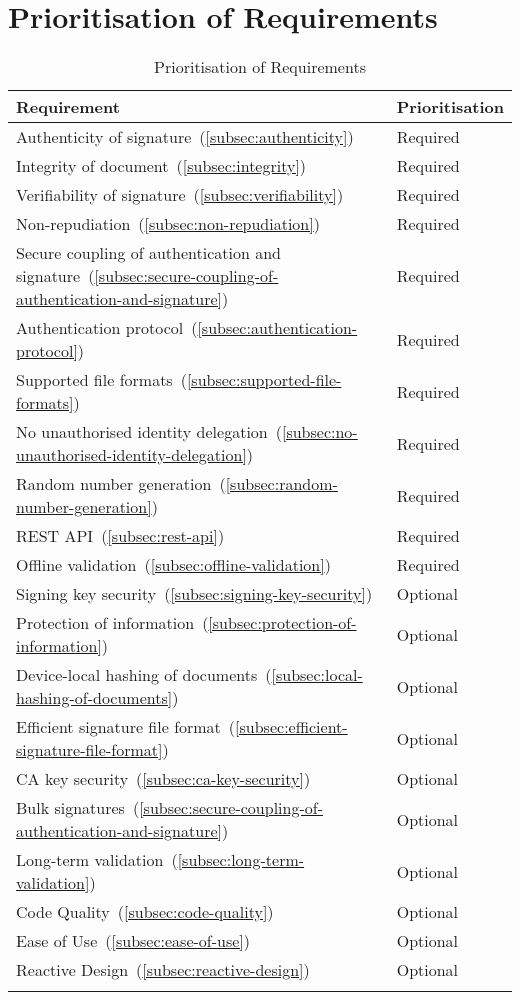\section{Prioritisation of Requirements}
\label{sec:prioritisation}
\begin{longtable}{p{12cm}|p{2.5cm}}
    \textbf{Requirement} & \textbf{Prioritisation}\\
    \hline
    Authenticity of signature~(\ref{subsec:authenticity}) & Required\\
    Integrity of document~(\ref{subsec:integrity}) & Required\\
    Verifiability of signature~(\ref{subsec:verifiability}) & Required\\
    Non-repudiation~(\ref{subsec:non-repudiation}) & Required\\
    Secure coupling of authentication and signature~(\ref{subsec:secure-coupling-of-authentication-and-signature}) & Required\\
    Authentication protocol~(\ref{subsec:authentication-protocol}) & Required\\
    Supported file formats~(\ref{subsec:supported-file-formats}) & Required\\
    No unauthorised identity delegation~(\ref{subsec:no-unauthorised-identity-delegation}) & Required\\
    Random number generation~(\ref{subsec:random-number-generation}) & Required\\
    \gls{REST} \gls{API}~(\ref{subsec:rest-api}) & Required\\
    Offline validation~(\ref{subsec:offline-validation}) & Required\\
    Signing key security~(\ref{subsec:signing-key-security}) & Optional\\
    Protection of information~(\ref{subsec:protection-of-information}) & Optional\\
    Device-local hashing of documents~(\ref{subsec:local-hashing-of-documents}) & Optional\\
    Efficient signature file format~(\ref{subsec:efficient-signature-file-format}) & Optional\\
    \gls{CA} key security~(\ref{subsec:ca-key-security}) & Optional\\
    Bulk signatures~(\ref{subsec:secure-coupling-of-authentication-and-signature}) & Optional\\
    Long-term validation~(\ref{subsec:long-term-validation}) & Optional\\
    Code Quality~(\ref{subsec:code-quality}) & Optional\\
    Ease of Use~(\ref{subsec:ease-of-use}) & Optional\\
    Reactive Design~(\ref{subsec:reactive-design}) & Optional\\
    \caption{Prioritisation of Requirements}
\end{longtable}
